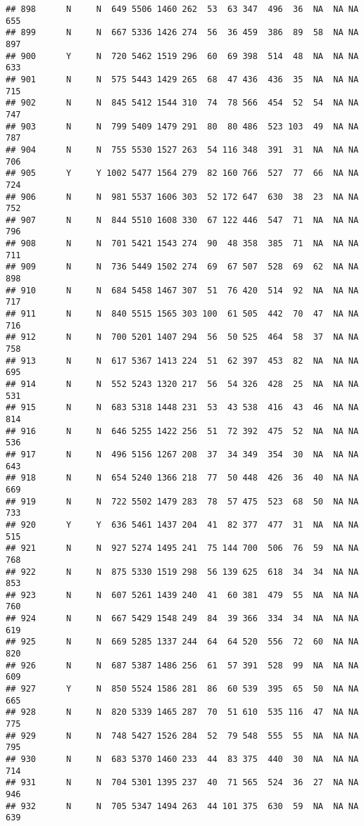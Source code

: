 \documentclass[]{article}
\begin{document}
\begin{verbatim}
## 898      N     N  649 5506 1460 262  53  63 347  496  36  NA  NA NA  655
## 899      N     N  667 5336 1426 274  56  36 459  386  89  58  NA NA  897
## 900      Y     N  720 5462 1519 296  60  69 398  514  48  NA  NA NA  633
## 901      N     N  575 5443 1429 265  68  47 436  436  35  NA  NA NA  715
## 902      N     N  845 5412 1544 310  74  78 566  454  52  54  NA NA  747
## 903      N     N  799 5409 1479 291  80  80 486  523 103  49  NA NA  787
## 904      N     N  755 5530 1527 263  54 116 348  391  31  NA  NA NA  706
## 905      Y     Y 1002 5477 1564 279  82 160 766  527  77  66  NA NA  724
## 906      N     N  981 5537 1606 303  52 172 647  630  38  23  NA NA  752
## 907      N     N  844 5510 1608 330  67 122 446  547  71  NA  NA NA  796
## 908      N     N  701 5421 1543 274  90  48 358  385  71  NA  NA NA  711
## 909      N     N  736 5449 1502 274  69  67 507  528  69  62  NA NA  898
## 910      N     N  684 5458 1467 307  51  76 420  514  92  NA  NA NA  717
## 911      N     N  840 5515 1565 303 100  61 505  442  70  47  NA NA  716
## 912      N     N  700 5201 1407 294  56  50 525  464  58  37  NA NA  758
## 913      N     N  617 5367 1413 224  51  62 397  453  82  NA  NA NA  695
## 914      N     N  552 5243 1320 217  56  54 326  428  25  NA  NA NA  531
## 915      N     N  683 5318 1448 231  53  43 538  416  43  46  NA NA  814
## 916      N     N  646 5255 1422 256  51  72 392  475  52  NA  NA NA  536
## 917      N     N  496 5156 1267 208  37  34 349  354  30  NA  NA NA  643
## 918      N     N  654 5240 1366 218  77  50 448  426  36  40  NA NA  669
## 919      N     N  722 5502 1479 283  78  57 475  523  68  50  NA NA  733
## 920      Y     Y  636 5461 1437 204  41  82 377  477  31  NA  NA NA  515
## 921      N     N  927 5274 1495 241  75 144 700  506  76  59  NA NA  768
## 922      N     N  875 5330 1519 298  56 139 625  618  34  34  NA NA  853
## 923      N     N  607 5261 1439 240  41  60 381  479  55  NA  NA NA  760
## 924      N     N  667 5429 1548 249  84  39 366  334  34  NA  NA NA  619
## 925      N     N  669 5285 1337 244  64  64 520  556  72  60  NA NA  820
## 926      N     N  687 5387 1486 256  61  57 391  528  99  NA  NA NA  609
## 927      Y     N  850 5524 1586 281  86  60 539  395  65  50  NA NA  665
## 928      N     N  820 5339 1465 287  70  51 610  535 116  47  NA NA  775
## 929      N     N  748 5427 1526 284  52  79 548  555  55  NA  NA NA  795
## 930      N     N  683 5370 1460 233  44  83 375  440  30  NA  NA NA  714
## 931      N     N  704 5301 1395 237  40  71 565  524  36  27  NA NA  946
## 932      N     N  705 5347 1494 263  44 101 375  630  59  NA  NA NA  639

\end{verbatim}
\end{document}
